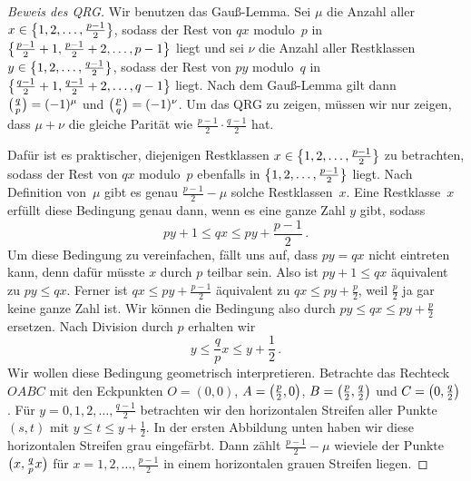 \begin{proof}[Beweis des QRG]
	Wir benutzen das Gauß-Lemma. Sei $\mu$ die Anzahl aller $x\in\braces[\big]{1,2,\dotsc,\frac{p-1}2}$, sodass der Rest von $qx$ modulo~$p$ in $\braces[\big]{\frac{p-1}{2}+1,\frac{p-1}{2}+2,\dotsc,p-1}$ liegt und sei $\nu$ die Anzahl aller Restklassen $y\in\braces[\big]{1,2,\dotsc,\frac{q-1}2}$, sodass der Rest von $py$ modulo~$q$ in $\braces[\big]{\frac{q-1}{2}+1,\frac{q-1}{2}+2,\dotsc,q-1}$ liegt. Nach dem Gauß-Lemma gilt dann $\parens[\big]{\frac{q}{p}}=(-1)^\mu$ und $\parens[\big]{\frac{p}{q}}=(-1)^\nu$. Um das QRG zu zeigen, müssen wir nur zeigen, dass $\mu+\nu$ die gleiche Parität wie $\frac{p-1}{2}\cdot \frac{q-1}{2}$ hat.
	
	Dafür ist es praktischer, diejenigen Restklassen $x\in\braces[\big]{1,2,\dotsc,\frac{p-1}2}$ zu betrachten, sodass der Rest von $qx$ modulo~$p$ ebenfalls in $\braces[\big]{1,2,\dotsc,\frac{p-1}2}$ liegt. Nach Definition von~$\mu$ gibt es genau $\frac{p-1}{2}-\mu$ solche Restklassen~$x$. Eine Restklasse~$x$ erfüllt diese Bedingung genau dann, wenn es eine ganze Zahl $y$ gibt, sodass
	\begin{equation*}
		py+1\leqslant qx\leqslant py+\frac{p-1}{2}\,.%
	\end{equation*}
	Um diese Bedingung zu vereinfachen, fällt uns auf, dass $py=qx$ nicht eintreten kann, denn dafür müsste $x$ durch $p$ teilbar sein. Also ist $py+1\leqslant qx$ äquivalent zu $py\leqslant qx$. Ferner ist $qx\leqslant py+\frac{p-1}{2}$ äquivalent zu $qx\leqslant py+\frac{p}{2}$, weil $\frac{p}{2}$ ja gar keine ganze Zahl ist. Wir können die Bedingung also durch $py\leqslant qx\leqslant py+\frac{p}{2}$ ersetzen. Nach Division durch $p$ erhalten wir
	\begin{equation*}
		y\leqslant \frac{q}{p}x\leqslant y+\frac12\,.
	\end{equation*}
	Wir wollen diese Bedingung geometrisch interpretieren. Betrachte das Rechteck $OABC$ mit den Eckpunkten $O=(0,0)$, $A=\parens[\big]{\frac p2,0}$,  $B=\parens[\big]{\frac p2,\frac q2}$ und $C=\parens[\big]{0,\frac q2}$. Für $y=0,1,2,\dotsc,\frac{q-1}{2}$ betrachten wir den horizontalen Streifen aller Punkte $(s,t)$ mit $y\leqslant t\leqslant y+\frac 12$. In der ersten Abbildung unten haben wir diese horizontalen Streifen grau eingefärbt. Dann zählt $\frac{p-1}{2}-\mu$ wieviele der Punkte $\parens[\big]{x,\frac qpx}$ für $x=1,2,\dotsc,\frac{p-1}{2}$ in einem horizontalen grauen Streifen liegen.
	

\end{proof}
